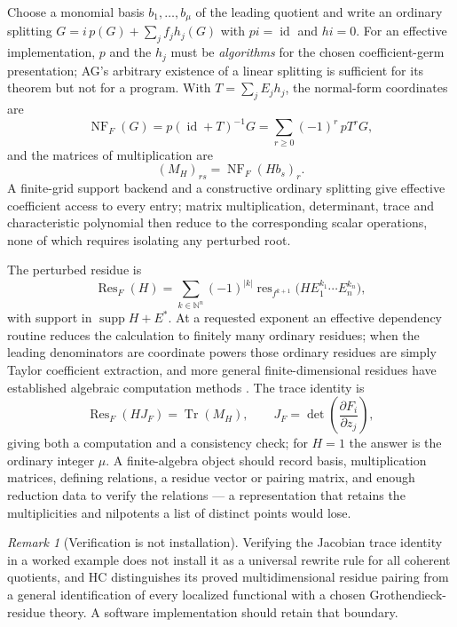 \documentclass[11pt,letterpaper]{article}
\numberwithin{equation}{section}
\theoremstyle{definition}
\theoremstyle{remark}
\newtheorem{remark}[theorem]{Remark}
\newcommand{\N}{\mathbb N}
\newcommand{\supp}{\operatorname{supp}}
\newcommand{\Res}{\operatorname{Res}}
\newcommand{\res}{\operatorname{res}}
\newcommand{\NF}{\operatorname{NF}}
\newcommand{\Tr}{\operatorname{Tr}}
\newcommand{\id}{\operatorname{id}}
\begin{document}
Choose a monomial basis $b_1,\dots,b_\mu$ of the leading quotient and write an
ordinary splitting $G=i\,p(G)+\sum_jf_jh_j(G)$ with $pi=\id$ and $hi=0$. For an
effective implementation, $p$ and the $h_j$ must be \emph{algorithms} for the
chosen coefficient-germ presentation; AG's arbitrary existence of a linear
splitting is sufficient for its theorem but not for a program. With
$T=\sum_jE_jh_j$, the normal-form coordinates are
\begin{equation}\label{cas:eq-NF}
 \NF_F(G)=p(\id+T)^{-1}G=\sum_{r\ge0}(-1)^r\,pT^rG ,
\end{equation}
and the matrices of multiplication are
\begin{equation}\label{cas:eq-multmatrices}
 (M_H)_{rs}=\NF_F(Hb_s)_r .
\end{equation}
A finite-grid support backend and a constructive ordinary splitting give
effective coefficient access to every entry; matrix multiplication, determinant,
trace and characteristic polynomial then reduce to the corresponding scalar
operations, none of which requires isolating any perturbed root.

The perturbed residue is
\begin{equation}\label{cas:eq-perturbedresidue}
 \Res_F(H)=\sum_{k\in\N^n}(-1)^{|k|}
 \res_{f^{k+1}}\!\bigl(HE_1^{k_1}\cdots E_n^{k_n}\bigr),
\end{equation}
with support in $\supp H+E^*$. At a requested exponent an effective dependency
routine reduces the calculation to finitely many ordinary residues; when the
leading denominators are coordinate powers those ordinary residues are simply
Taylor coefficient extraction, and more general finite-dimensional residues have
established algebraic computation methods \cite{cas:CDS}. The trace identity is
\begin{equation}\label{cas:eq-traceidentity}
 \Res_F(HJ_F)=\Tr(M_H),\qquad
 J_F=\det\!\left(\frac{\partial F_i}{\partial z_j}\right),
\end{equation}
giving both a computation and a consistency check; for $H=1$ the answer is the
ordinary integer $\mu$. A finite-algebra object should record basis,
multiplication matrices, defining relations, a residue vector or pairing matrix,
and enough reduction data to verify the relations --- a representation that
retains the multiplicities and nilpotents a list of distinct points would lose.

\begin{remark}[Verification is not installation]\label{cas:rem-notrewrite}
Verifying the Jacobian trace identity in a worked example does not install it as
a universal rewrite rule for all coherent quotients, and HC distinguishes its
proved multidimensional residue pairing from a general identification of every
localized functional with a chosen Grothendieck-residue theory. A software
implementation should retain that boundary.
\end{remark}
\end{document}
